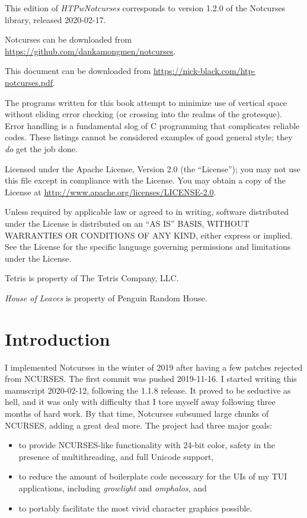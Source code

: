 \documentclass[letterpaper,10pt]{article}
\newenvironment{denseitemize}{
  \begin{itemize}
      \setlength{\itemsep}{0pt}
}{
  \end{itemize}
}
\begin{document}
\small{This edition of \textit{HTPwNotcurses} corresponds to version 1.2.0 of the Notcurses
library, released 2020-02-17.

Notcurses can be downloaded from
\url{https://github.com/dankamongmen/notcurses}.

This document can be downloaded
from \url{https://nick-black.com/htp-notcurses.pdf}.

The programs written for this book attempt to minimize use of vertical space
without eliding error checking (or crossing into the realms of the grotesque).
Error handling is a fundamental slog of C programming that
complicates reliable codes. These listings cannot be considered examples
of good general style; they \textit{do} get the job done.

Licensed under the Apache License, Version 2.0 (the ``License''); you may not use
this file except in compliance with the License. You may obtain a copy of the
License at \url{http://www.apache.org/licenses/LICENSE-2.0}.

Unless required by applicable law or agreed to in writing, software
distributed under the License is distributed on an ``AS IS'' BASIS,
WITHOUT WARRANTIES OR CONDITIONS OF ANY KIND, either express or implied.
See the License for the specific language governing permissions and
limitations under the License.

Tetris is property of The Tetris Company, LLC.

\textit{House of Leaves} is property of Penguin Random House.
}


\clearpage

\section{Introduction}

I implemented Notcurses in the winter of 2019 after having a few patches
rejected from NCURSES. The first commit was pushed 2019-11-16. I started
writing this manuscript 2020-02-12, following the 1.1.8 release. It proved to
be seductive as hell, and it was only with difficulty that I tore myself away
following three months of hard work. By that time, Notcurses subsumed large
chunks of NCURSES, adding a great deal more. The project had three
major goals:

\begin{denseitemize}
\item to provide NCURSES-like functionality with 24-bit color, safety in the
    presence of multithreading, and full Unicode support,
\item to reduce the amount of boilerplate code necessary for the UIs of my
    TUI applications, including \textit{growlight} and \textit{omphalos}, and
\item to portably facilitate the most vivid character graphics possible.
\end{denseitemize}
\end{document}
